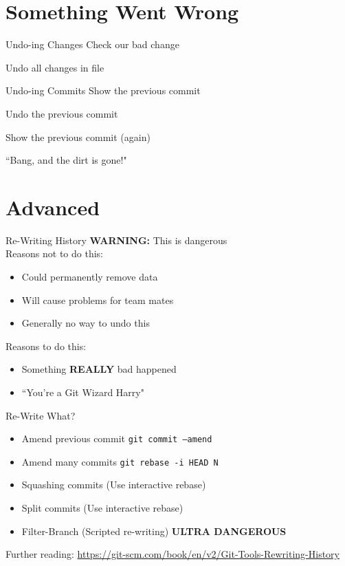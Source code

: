 \documentclass{beamer}
\begin{document}
  \section{Something Went Wrong}
  \begin{frame}[fragile=singleslide]{Undo-ing Changes}
    Check our bad change
    
    Undo all changes in file
    
  \end{frame}
  \begin{frame}[fragile=singleslide]{Undo-ing Commits}
    Show the previous commit
    
    Undo the previous commit
    
  \end{frame}
  \begin{frame}[fragile=singleslide]
    Show the previous commit (again)
    
    ``Bang, and the dirt is gone!"
  \end{frame}
  \section{Advanced}
  \begin{frame}{Re-Writing History}
    \textbf{WARNING:} This is dangerous
    \\
    Reasons not to do this:
    \begin{itemize}
      \item Could permanently remove data
      \item Will cause problems for team mates
      \item Generally no way to undo this
    \end{itemize}
    Reasons to do this:
    \begin{itemize}
      \item Something \textbf{REALLY} bad happened
      \item ``You're a Git Wizard Harry"
    \end{itemize}
  \end{frame}
  \begin{frame}{Re-Write What?}
    \begin{itemize}
      \item Amend previous commit \texttt{git commit --amend}
      \item Amend many commits \texttt{git rebase -i HEAD~N}
      \item Squashing commits (Use interactive rebase)
      \item Split commits (Use interactive rebase)
      \item Filter-Branch (Scripted re-writing) \textbf{ULTRA DANGEROUS}
    \end{itemize}
    Further reading:
    \url{https://git-scm.com/book/en/v2/Git-Tools-Rewriting-History}
  \end{frame}
\end{document}
